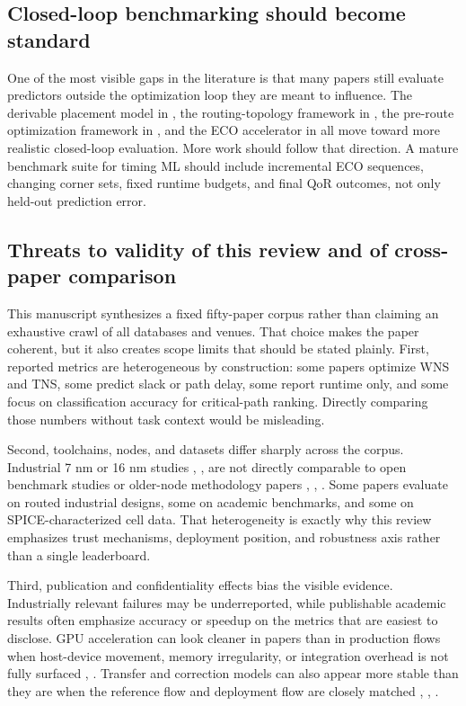 \documentclass[num-refs]{wiley-article}
\begin{document}
  \subsection{Closed-loop benchmarking should become standard}

  One of the most visible gaps in the literature is that many papers still evaluate predictors outside the optimization loop they are meant to influence. The derivable placement model in \cite{ref3}, the routing-topology framework in \cite{ref7}, the pre-route optimization framework in \cite{ref17}, and the ECO accelerator in \cite{ref19} all move toward more realistic closed-loop evaluation. More work should follow that direction. A mature benchmark suite for timing ML should include incremental ECO sequences, changing corner sets, fixed runtime budgets, and final QoR outcomes, not only held-out prediction error.


  \subsection{Threats to validity of this review and of cross-paper comparison}

  This manuscript synthesizes a fixed fifty-paper corpus rather than claiming an exhaustive crawl of all databases and venues. That choice makes the paper coherent, but it also creates scope limits that should be stated plainly. First, reported metrics are heterogeneous by construction: some papers optimize WNS and TNS, some predict slack or path delay, some report runtime only, and some focus on classification accuracy for critical-path ranking. Directly comparing those numbers without task context would be misleading.


  Second, toolchains, nodes, and datasets differ sharply across the corpus. Industrial 7 nm or 16 nm studies \cite{ref8}, \cite{ref13}, \cite{ref16} are not directly comparable to open benchmark studies or older-node methodology papers \cite{ref27}, \cite{ref29}, \cite{ref47}. Some papers evaluate on routed industrial designs, some on academic benchmarks, and some on SPICE-characterized cell data. That heterogeneity is exactly why this review emphasizes trust mechanisms, deployment position, and robustness axis rather than a single leaderboard.


  Third, publication and confidentiality effects bias the visible evidence. Industrially relevant failures may be underreported, while publishable academic results often emphasize accuracy or speedup on the metrics that are easiest to disclose. GPU acceleration can look cleaner in papers than in production flows when host-device movement, memory irregularity, or integration overhead is not fully surfaced \cite{ref21}, \cite{ref22}. Transfer and correction models can also appear more stable than they are when the reference flow and deployment flow are closely matched \cite{ref10}, \cite{ref13}, \cite{ref25}.
\end{document}
